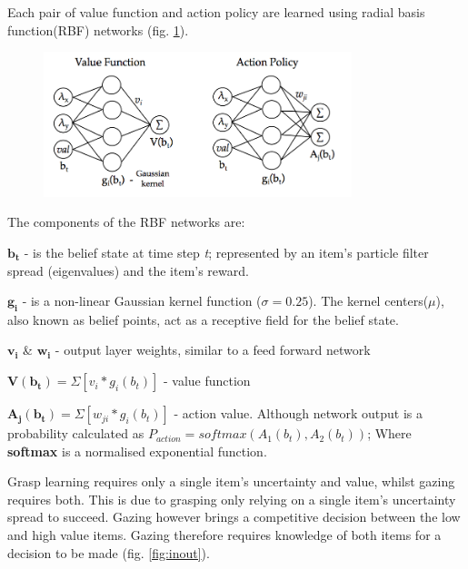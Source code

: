 \documentclass[11]{article}
\begin{document}
\pagebreak
Each pair of value function and action policy are learned using radial basis function(RBF) networks (fig. \ref{fig:rbf}).

\begin{figure}[!h]
	\centering
	\includegraphics[width=0.8\textwidth]{figures/rbf.png}
	\caption{}
	\label{fig:rbf}
\end{figure} 

The components of the RBF networks are:
\begin{list}{}{}
  \item $\pmb{b_t}$ - is the belief state at time step \emph{t}; represented by an item's particle filter spread (eigenvalues) and the item's reward. 

 \item $\pmb{g_i}$ - is a non-linear Gaussian kernel function ($\sigma=0.25$).
   The kernel centers($\mu$), also known as belief points, act as a receptive field for the belief state.

 \item $\pmb{v_i}$ \& $\pmb{w_i}$ - output layer weights, similar to a feed forward network

 \item $\pmb{V(b_t)}= \Sigma[v_i * g_i(b_t)]$ - value function

 \item $\pmb{A_j(b_t)}= \Sigma[w_{ji} * g_i(b_t)]$ - action value.
   Although network output is a probability calculated as $P_{action} = softmax(A_1(b_t),A_2(b_t))$; 
   Where \textbf{softmax} is a normalised exponential function.
\end{list}

Grasp learning requires only a single item's uncertainty and value, whilst gazing requires both. 
This is due to grasping only relying on a single item's uncertainty spread to succeed.
Gazing however brings a competitive decision between the low and high value items.
Gazing therefore requires knowledge of both items for a decision to be made (fig. \ref{fig:inout}). 
\end{document}
